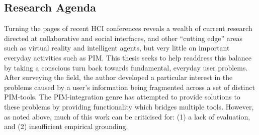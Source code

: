 

\subsection{Research Agenda}
\label{review:research-agenda}


Turning the pages of recent HCI conferences reveals a wealth of current research directed at collaborative and social interfaces, and other ``cutting edge'' areas such as virtual reality and intelligent agents, but very little on important everyday activities such as PIM.  This thesis seeks to help readdress this balance by taking a conscious turn back towards fundamental, everyday user problems.  After surveying the field, the author developed a particular interest in the problems caused by a user's information being fragmented across a set of distinct PIM-tools.  The PIM-integration genre has attempted to provide solutions to these problems by providing functionality which bridges multiple tools.  However, as noted above, much of this work can be criticised for: (1) a lack of evaluation, and (2) insufficient empirical grounding.

